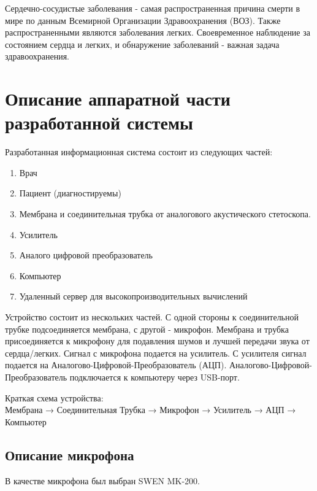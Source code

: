Сердечно-сосудистые заболевания - самая распространенная причина смерти в мире по данным Всемирной Организации Здравоохранения (ВОЗ). Также распространенными являются заболевания легких. Своевременное наблюдение за состоянием сердца и легких, и обнаружение заболеваний - важная задача здравоохранения.

\newpage  
\section{Описание аппаратной части разработанной системы}
Разработанная информационная система состоит из следующих частей:
\begin{enumerate}
  \item Врач
  \item Пациент (диагностируемы)
  \item Мембрана и соединительная трубка от аналогового акустического стетоскопа.
  \item Усилитель
  \item Аналого цифровой преобразователь
  \item Компьютер
  \item Удаленный сервер для высокопроизводительных вычислений
\end{enumerate}

Устройство состоит из нескольких частей. С одной стороны к соединительной трубке подсоединяется мембрана, с другой - микрофон. Мембрана и трубка присоединяется к микрофону для подавления шумов и лучшей передачи звука от сердца/легких. Сигнал с микрофона подается на усилитель. С усилителя сигнал подается на Аналогово-Цифровой-Преобразователь (АЦП). Аналогово-Цифровой-Преобразователь подключается к компьютеру через USB-порт.

\begin{center}
Краткая схема устройства:\\
\noindent\small{{Мембрана → Соединительная Трубка → Микрофон → Усилитель → АЦП → Компьютер}}
\end{center}


\subsection{Описание микрофона}
В качестве микрофона был выбран SWEN MK-200. \\

